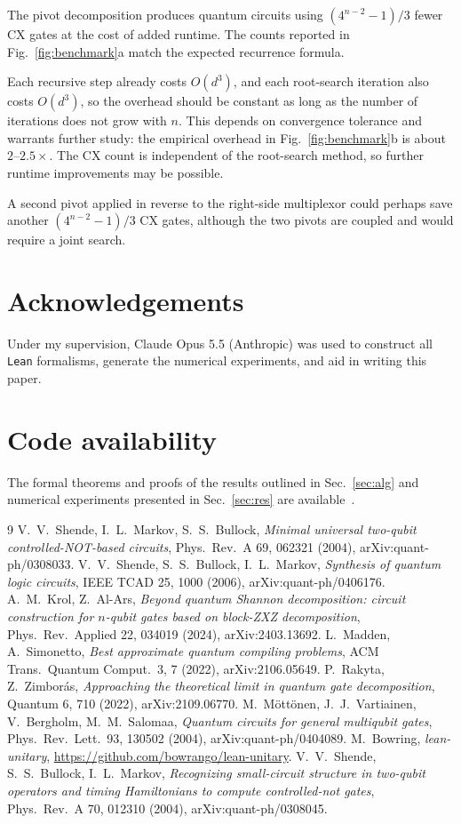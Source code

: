 \documentclass[11pt]{article}
\begin{document}
The pivot decomposition produces quantum circuits using $(4^{n-2}-1)/3$ fewer CX gates at the cost of added runtime. The counts reported in Fig.~\ref{fig:benchmark}a match the expected recurrence formula.

Each recursive step already costs $O(d^3)$, and each root-search iteration also costs $O(d^3)$, so the overhead should be constant as long as the number of iterations does not grow with $n$. This depends on convergence tolerance and warrants further study: the empirical overhead in Fig.~\ref{fig:benchmark}b is about $2$--$2.5\times$. The CX count is independent of the root-search method, so further runtime improvements may be possible.

A second pivot applied in reverse to the right-side multiplexor could perhaps save another
$(4^{n-2}-1)/3$ CX gates, although the two pivots are coupled and would require a joint search.

\section*{Acknowledgements}

Under my supervision, Claude Opus 5.5 (Anthropic) was used to construct all \texttt{Lean} formalisms, generate the numerical experiments, and aid in writing this paper.

\section*{Code availability}

The formal theorems and proofs of the results outlined in Sec.~\ref{sec:alg} and numerical experiments presented in Sec.~\ref{sec:res}
are available~\cite{code}.

\begin{thebibliography}{9}
 V.~V.~Shende, I.~L.~Markov, S.~S.~Bullock, \emph{Minimal universal two-qubit
controlled-NOT-based circuits}, Phys.\ Rev.\ A 69, 062321 (2004), arXiv:quant-ph/0308033.
 V.~V.~Shende, S.~S.~Bullock, I.~L.~Markov, \emph{Synthesis of quantum logic
circuits}, IEEE TCAD 25, 1000 (2006), arXiv:quant-ph/0406176.
 A.~M.~Krol, Z.~Al-Ars, \emph{Beyond quantum Shannon decomposition: circuit
construction for $n$-qubit gates based on block-ZXZ decomposition}, Phys.\ Rev.\ Applied 22,
034019 (2024), arXiv:2403.13692.
 L.~Madden, A.~Simonetto, \emph{Best approximate quantum compiling problems},
ACM Trans.\ Quantum Comput.\ 3, 7 (2022), arXiv:2106.05649.
 P.~Rakyta, Z.~Zimbor\'as, \emph{Approaching the theoretical limit in quantum
gate decomposition}, Quantum 6, 710 (2022), arXiv:2109.06770.
 M.~M\"ott\"onen, J.~J.~Vartiainen, V.~Bergholm, M.~M.~Salomaa,
\emph{Quantum circuits for general multiqubit gates}, Phys.\ Rev.\ Lett.\ 93, 130502 (2004),
arXiv:quant-ph/0404089.
 M.~Bowring, \emph{lean-unitary}, \url{https://github.com/bowrango/lean-unitary}.
 V.~V.~Shende, S.~S.~Bullock, I.~L.~Markov, \emph{Recognizing small-circuit
structure in two-qubit operators and timing Hamiltonians to compute controlled-not gates}, Phys.\ Rev.\ A 70, 012310 (2004), arXiv:quant-ph/0308045.
\end{thebibliography}
\end{document}
